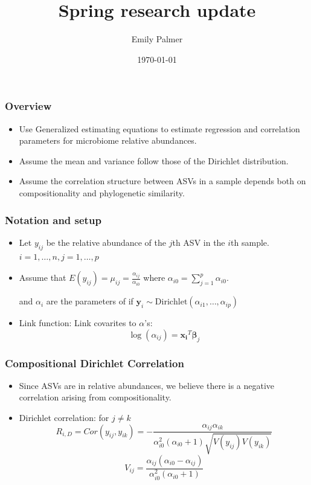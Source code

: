 \documentclass{beamer}
\title[Research Update]{Spring research update} %
\author{Emily Palmer} %
\institute[OSU] %
  {Oregon State University \\ %
    \medskip
    \textit{palmerem@oregonstate.edu} %
  }
\date{\today} %
\begin{document}
  \begin{frame}
  \titlepage %
  \end{frame}



\begin{frame}
\frametitle{Overview}
\begin{itemize}
  \item Use Generalized estimating equations to estimate regression  and correlation parameters for microbiome relative abundances.
  \item Assume the mean and variance follow those of the Dirichlet distribution.
  \item Assume the correlation structure between ASVs in a sample depends both on compositionality and phylogenetic similarity.
\end{itemize}
\end{frame}

\begin{frame}
\frametitle{Notation and setup}
\begin{itemize}
  \item Let $y_{ij}$ be the relative abundance of the $j$th ASV in the $i$th sample. $i = 1, \ldots , n, j = 1, \ldots , p$
  \item Assume that $E(y_{ij})  = \mu_{ij} = \frac{\alpha_{ij}}{\alpha_{i0}}$
  where $\alpha_{i0} = \sum_{j = 1}^p \alpha_{i0}$.

  and $\alpha_i$ are the parameters of if
  $\mathbf{y}_i \sim \text{Dirichlet}(\alpha_{i1}, \ldots , \alpha_{ip})$

  \item Link function: Link covarites to $\alpha$'s:
  $$\log(\alpha_{ij}) = \mathbf{x_i}^T\boldsymbol\beta_j$$
\end{itemize}
\end{frame}


\begin{frame}
\frametitle{Compositional Dirichlet Correlation}
\begin{itemize}
  \item Since ASVs are in relative abundances, we believe there is a negative correlation arising from compositionality.
  \item Dirichlet correlation:
  for $j \neq k$
  \[ R_{i,D} = Cor(y_{ij}, y_{ik})  = - \frac{\alpha_{ij}\alpha_{ik}}{\alpha_{i0}^2(\alpha_{i0} + 1)\sqrt{V(y_{ij})V(y_{ik})}} \]
  \[ V_{ij} = \frac{\alpha_{ij}(\alpha_{i0} - \alpha_{ij})}{\alpha_{i0}^2(\alpha_{i0} + 1)} \]
\end{itemize}
\end{frame}
\end{document}
